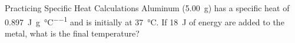\documentclass[notes=only]{beamer}
\begin{document}
%

\begin{frame}[t]{Practicing Specific Heat Calculations}
	Aluminum (\SI{5.00}{\gram}) has a specific heat of
	\SI{0.897}{\joule\per\gram\per\celsius} and is initially at
	\SI{37}{\celsius}. If \SI{18}{\joule} of energy are added to the metal,
	what is the final temperature?

\end{frame}
\end{document}
